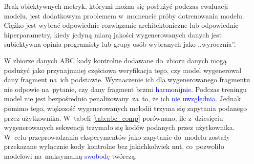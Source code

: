 \documentclass[data-science]{agh-wi} %
\begin{document}
Brak obiektywnych metryk, którymi można się posłużyć podczas ewaluacji modelu, jest dodatkowym problemem w~momencie próby dotrenowania modelu. Ciężko jest wybrać odpowiednie rozwiązanie architektoniczne lub odpowiednie hiperparametry, kiedy jedyną miarą jakości wygenerowanych danych jest subiektywna opinia programisty lub grupy osób wybranych jako ,,wyrocznia''.

W zbiorze danych ABC kody kontrolne dodawane do~zbioru danych mogą posłużyć jako przynajmniej częściowa weryfikacja tego, czy model wygenerował dany fragment na~ich podstawie. Wyznaczenie ich dla wygenerowanego fragmentu nie odpowie na~pytanie, czy dany fragment brzmi \textcolor{blue}{harmonijnie}. Podczas treningu model nie jest bezpośrednio penalizowany~za~to, że ich \textcolor{blue}{nie uwzględnia}. Jednak pomimo tego, większość wygenerowanych melodii trzyma się zapytania podanego przez użytkownika. W~tabeli \ref*{tab:abc_comp} porównano, ile z~dziesięciu wygenerowanych sekwencji trzymało się kodów podanych przez użytkownika. W~celu przeprowadzania eksperymentów jako zapytanie do~modelu zostały przekazane wyłącznie kody kontrolne bez jakichkolwiek nut, co~pozwoliło modelowi na~maksymalną \textcolor{blue}{swobodę} twórczą.
\end{document}
